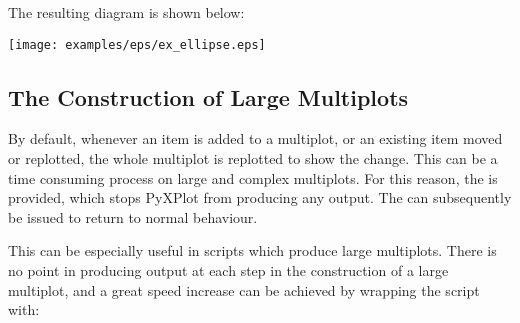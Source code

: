 {{\newline
{}\newline
{}\newline
{}\newline
{}\newline
{}\newline
{}\newline
{}\newline
{}\newline
{}\newline
{}\newline
\noindent {\tt }\newline
{}\newline
{}\newline
}
\vspace{2mm}

The resulting diagram is shown below:

\centerline{\texttt{[image: examples/eps/ex\_ellipse.eps]}}
}

\subsection{The Construction of Large Multiplots}
\label{sec:set_display}

By default, whenever an item is added to a multiplot, or an existing item moved
or replotted, the whole multiplot is replotted to show the change. This can be
a time consuming process on large and complex multiplots. For this reason, the
 is provided, which stops PyXPlot from producing any
output. The  can subsequently be issued to return to
normal behaviour.

This can be especially useful in scripts which produce large multiplots. There
is no point in producing output at each step in the construction of a large
multiplot, and a great speed increase can be achieved by wrapping the script
with:

